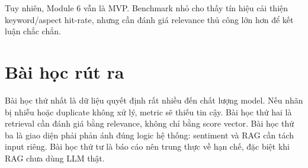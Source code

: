 Tuy nhiên, Module 6 vẫn là MVP. Benchmark nhỏ cho thấy tín hiệu cải thiện keyword/aspect hit-rate, nhưng cần đánh giá relevance thủ công lớn hơn để kết luận chắc chắn.

\section{Bài học rút ra}
Bài học thứ nhất là dữ liệu quyết định rất nhiều đến chất lượng model. Nếu nhãn bị nhiễu hoặc duplicate không xử lý, metric sẽ thiếu tin cậy. Bài học thứ hai là retrieval cần đánh giá bằng relevance, không chỉ bằng score vector. Bài học thứ ba là giao diện phải phản ánh đúng logic hệ thống: sentiment và RAG cần tách input riêng. Bài học thứ tư là báo cáo nên trung thực về hạn chế, đặc biệt khi RAG chưa dùng LLM thật.

